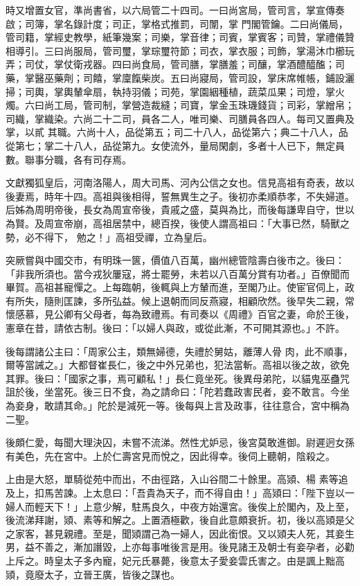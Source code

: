 \begin{pinyinscope}
 時又增置女官，準尚書省，以六局管二十四司。一曰尚宮局，管司言，掌宣傳奏啟；司簿，掌名錄計度；司正，掌格式推罰，司闈，掌
 門閣管鑰。二曰尚儀局，管司籍，掌經史教學，紙筆幾案；司樂，掌音律；司賓，掌賓客；司贊，掌禮儀贊相導引。三曰尚服局，管司璽，掌琮璽符節；司衣，掌衣服；司飾，掌湯沐巾櫛玩弄；司仗，掌仗衛戎器。四曰尚食局，管司膳，掌膳羞；司釀，掌酒醴醯醢；司藥，掌醫巫藥劑；司饎，掌廩餼柴炭。五曰尚寢局，管司設，掌床席帷帳，鋪設灑掃；司輿，掌輿輦傘扇，執持羽儀；司苑，掌園絪種植，蔬菜瓜果；司燈，掌火燭。六曰尚工局，管司制，掌營造裁縫；司寶，掌金玉珠璣錢貨；司彩，掌繒帛；司織，掌織染。六尚二十二司，員各二人，唯司樂、司膳員各四人。每司又置典及掌，以貳
 其職。六尚十人，品從第五；司二十八人，品從第六；典二十八人，品從第七；掌二十八人，品從第九。女使流外，量局閑劇，多者十人已下，無定員數。聯事分職，各有司存焉。



 文獻獨狐皇后，河南洛陽人，周大司馬、河內公信之女也。信見高祖有奇表，故以後妻焉，時年十四。高祖與後相得，誓無異生之子。後初亦柔順恭孝，不失婦道。后姊為周明帝後，長女為周宣帝後，貴戚之盛，莫與為比，而後每謙卑自守，世以為賢。及周宣帝崩，高祖居禁中，總百揆，後使人謂高祖曰：「大事已然，騎獸之勢，必不得下，
 勉之！」高祖受禪，立為皇后。



 突厥嘗與中國交市，有明珠一篋，價值八百萬，幽州總管陰壽白後市之。後曰：「非我所須也。當今戎狄屢寇，將士罷勞，未若以八百萬分賞有功者。」百僚聞而畢賀。高祖甚寵憚之。上每臨朝，後輒與上方輦而進，至閣乃止。使宦官伺上，政有所失，隨則匡諫，多所弘益。候上退朝而同反燕寢，相顧欣然。後早失二親，常懷感慕，見公卿有父母者，每為致禮焉。有司奏以《周禮》百官之妻，命於王後，憲章在昔，請依古制。後曰：「以婦人與政，或從此漸，不可開其源也。」不許。



 後每謂諸公主曰：「周家公主，類無婦德，失禮於舅姑，離薄人骨
 肉，此不順事，爾等當誡之。」大都督崔長仁，後之中外兄弟也，犯法當斬。高祖以後之故，欲免其罪。後曰：「國家之事，焉可顧私！」長仁竟坐死。後異母弟陀，以貓鬼巫蠱咒詛於後，坐當死。後三日不食，為之請命曰：「陀若蠢政害民者，妾不敢言。今坐為妾身，敢請其命。」陀於是減死一等。後每與上言及政事，往往意合，宮中稱為二聖。



 後頗仁愛，每聞大理決囚，未嘗不流涕。然性尤妒忌，後宮莫敢進御。尉遲迥女孫有美色，先在宮中。上於仁壽宮見而悅之，因此得幸。後伺上聽朝，陰殺之。



 上由是大怒，單騎從苑中而出，不由徑路，入山谷間二十餘里。高熲、楊
 素等追及上，扣馬苦諫。上太息曰：「吾貴為天子，而不得自由！」高熲曰：「陛下豈以一婦人而輕天下！」上意少解，駐馬良久，中夜方始還宮。後俟上於閣內，及上至，後流涕拜謝，熲、素等和解之。上置酒極歡，後自此意頗衰折。初，後以高熲是父之家客，甚見親禮。至是，聞熲謂己為一婦人，因此銜恨。又以熲夫人死，其妾生男，益不善之，漸加譖毀，上亦每事唯後言是用。後見諸王及朝士有妾孕者，必勸上斥之。時皇太子多內寵，妃元氏暴薨，後意太子愛妾雲氏害之。由是諷上黜高熲，竟廢太子，立晉王廣，皆後之謀也。




\end{pinyinscope}
